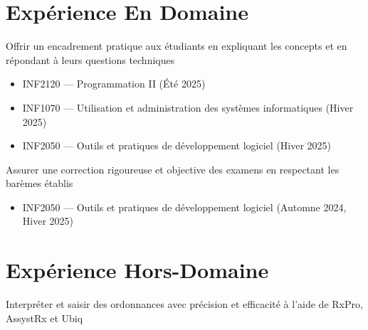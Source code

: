 \documentclass[letterpaper,10pt]{article}
\begin{document}

  \section{Expérience En Domaine}

  \begin{resume_list}
    \item Offrir un encadrement pratique aux étudiants en expliquant les concepts et en répondant à leurs questions techniques
    \begin{itemize}
        \item INF2120 — Programmation II (Été 2025)
        \item INF1070 — Utilisation et administration des systèmes informatiques (Hiver 2025)
        \item INF2050 — Outils et pratiques de développement logiciel (Hiver 2025)
    \end{itemize}
  \vspace{3pt}
  
    \item Assurer une correction rigoureuse et objective des examens en respectant les barèmes établis
    \begin{itemize}
        \item INF2050 — Outils et pratiques de développement logiciel (Automne 2024, Hiver 2025)
    \end{itemize}
  \end{resume_list}

   \section{Expérience Hors-Domaine}

  \begin{resume_list}
    \item Interpréter et saisir des ordonnances avec précision et efficacité à l'aide de RxPro, AssystRx et Ubiq
  \end{resume_list}
\end{document}
